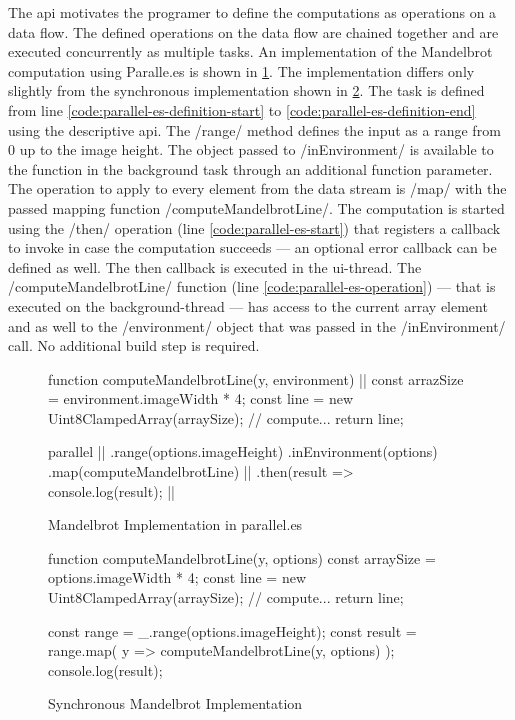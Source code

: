 The api motivates the programer to define the computations as operations on a data flow. The defined operations on the data flow are chained together and are executed concurrently as multiple tasks. An implementation of the Mandelbrot computation using Paralle.es is shown in \cref{code:mandelbrot-parallel.es}. The implementation differs only slightly from the synchronous implementation shown in \cref{fig:mandelbrot-sync}. The task is defined from line \ref{code:parallel-es-definition-start} to \ref{code:parallel-es-definition-end} using the descriptive api. The \javascriptinline/range/ method defines the input as a range from 0 up to the image height. The object passed to \javascriptinline/inEnvironment/ is available to the function in the background task through an additional function parameter. The operation to apply to every element from the data stream is \javascriptinline/map/ with the passed mapping function \javascriptinline/computeMandelbrotLine/. The computation is started using the \javascriptinline/then/ operation (line \ref{code:parallel-es-start}) that registers a callback to invoke in case the computation succeeds --- an optional error callback can be defined as well. The then callback is executed in the ui-thread. The \javascriptinline/computeMandelbrotLine/ function (line \ref{code:parallel-es-operation}) --- that is executed on the background-thread --- has access to the current array element and as well to the \javascriptinline/environment/ object that was passed in the \javascriptinline/inEnvironment/ call. No additional build step is required.


\begin{figure}
	\begin{javascriptcode}
function computeMandelbrotLine(y, environment) { |$\label{code:parallel-es-operation}$|
	const arrazSize = environment.imageWidth * 4;
	const line = new Uint8ClampedArray(arraySize);
	// compute...
	return line;
}

parallel      |$\label{code:parallel-es-definition-start}$|
	.range(options.imageHeight)
	.inEnvironment(options)
	.map(computeMandelbrotLine) |$\label{code:parallel-es-definition-end}$|
	.then(result => console.log(result); |$\label{code:parallel-es-start}$|
	\end{javascriptcode}
	
	\caption{Mandelbrot Implementation in parallel.es}
	\label{code:mandelbrot-parallel.es}
\end{figure}

\begin{figure}
	
	\begin{javascriptcode}
function computeMandelbrotLine(y, options) {
	const arraySize = options.imageWidth * 4;
	const line = new Uint8ClampedArray(arraySize);
	// compute...
	return line;
}

const range = _.range(options.imageHeight);
const result = range.map(
	y => computeMandelbrotLine(y, options)
);
console.log(result);
\end{javascriptcode}
\caption{Synchronous Mandelbrot Implementation}
\label{fig:mandelbrot-sync}
\end{figure}

